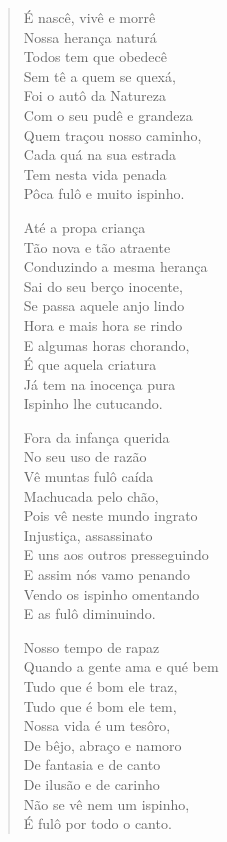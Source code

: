\begin{verse}
É nascê, vivê e morrê\\
Nossa herança naturá\\
Todos tem que obedecê\\
Sem tê a quem se quexá,\\
Foi o autô da Natureza\\
Com o seu pudê e grandeza\\
Quem traçou nosso caminho,\\
Cada quá na sua estrada\\
Tem nesta vida penada\\
Pôca fulô e muito ispinho.

Até a propa criança\\
Tão nova e tão atraente\\
Conduzindo a mesma herança\\
Sai do seu berço inocente,\\
Se passa aquele anjo lindo\\
Hora e mais hora se rindo\\
E algumas horas chorando,\\
É que aquela criatura\\
Já tem na inocença pura\\
Ispinho lhe cutucando.

Fora da infança querida\\
No seu uso de razão\\
Vê muntas fulô caída\\
Machucada pelo chão,\\
Pois vê neste mundo ingrato\\
Injustiça, assassinato\\
E uns aos outros presseguindo\\
E assim nós vamo penando\\
Vendo os ispinho omentando\\
E as fulô diminuindo.

Nosso tempo de rapaz\\
Quando a gente ama e qué bem\\
Tudo que é bom ele traz,\\
Tudo que é bom ele tem,\\
Nossa vida é um tesôro,\\
De bêjo, abraço e namoro\\
De fantasia e de canto\\
De ilusão e de carinho\\
Não se vê nem um ispinho,\\
É fulô por todo o canto.


\end{verse}
